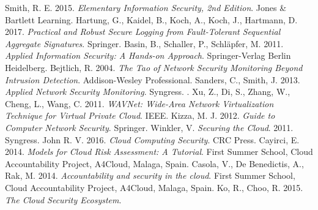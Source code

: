 \documentclass{article}
\begin{document}
\begin{thebibliography}{9}
        Smith, R. E.
        2015.
	\textit{Elementary Information Security, 2nd Edition}.
        Jones \& Bartlett Learning.
        Hartung, G.,
        Kaidel, B.,
        Koch, A.,
        Koch, J.,
        Hartmann, D.
        2017.
	\textit{Practical and Robust Secure Logging from Fault-Tolerant Sequential Aggregate Signatures}.
        Springer.
        Basin, B.,
        Schaller, P.,
        Schläpfer, M.
        2011.
	\textit{Applied Information Security: A Hands-on Approach}.
        Springer-Verlag Berlin Heidelberg.
        Bejtlich, R.
        2004.
	\textit{The Tao of Network Security Monitoring Beyond Intrusion Detection}.
        Addison-Wesley Professional.
        Sanders, C.,
	Smith, J.
        2013.
        \textit{Applied Network Security Monitoring}.
	Syngress.
.
        Xu, Z.,
        Di, S.,
        Zhang, W.,
        Cheng, L.,
        Wang, C.
	2011.
        \textit{WAVNet: Wide-Area Network Virtualization Technique for Virtual Private Cloud}.
        IEEE.
        Kizza, M. J.
        2012.
        \textit{Guide to Computer Network Security}.
	Springer.
        Winkler, V.
	\textit{Securing the Cloud}.
        2011.
        Syngress.
        John R. V.
        2016.
        \textit{Cloud Computing Security}.
	CRC Press.
        Cayirci, E.
	2014.
        \textit{Models for Cloud Risk Assessment: A Tutorial}.
        First Summer School, Cloud Accountability Project, A4Cloud, Malaga, Spain.
        Casola, V.,
        De Benedictis, A.,
        Rak, M.
        2014.
	\textit{Accountability and security in the cloud}.
       	First Summer School, Cloud Accountability Project, A4Cloud, Malaga, Spain. 
        Ko, R.,
	Choo, R.
        2015.
        \textit{The Cloud Security Ecosystem}.

\end{thebibliography}
\end{document}
